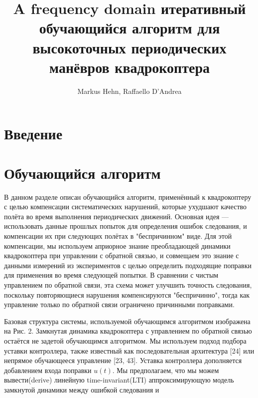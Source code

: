 \documentclass[12pt,a4paper,fleqn]{article}
\title{A frequency domain итеративный обучающийся алгоритм для высокоточных периодических манёвров квадрокоптера}
\author{
  Markus Hehn, Raffaello D’Andrea
}
\begin{document}
\pagestyle{fancy}             %

\maketitle
\tableofcontents
\newpage

\section{Введение} \label{sec:intro}

\section{Обучающийся алгоритм} \label{sec:learn}

В данном разделе описан обучающийся алгоритм, применённый к квадрокоптеру с целью компенсации систематических нарушений, которые ухудшают качество полёта во время выполнения периодических движений. Основная идея --- использовать данные прошлых попыток для определения ошибок следования, и компенсации их при следующих полётах в "беспричинном" виде. Для этой компенсации, мы используем априорное знание преобладающей динамики квадрокоптера при управлении с обратной связью, и совмещаем это знание с данными измерений из экспериментов с целью определить подходящие поправки для применения во время следующей попытки. В сравнении с чистым управлением по обратной связи, эта схема может улучшить точность следования, поскольку повторяющиеся нарушения компенсируются "беспричинно", тогда как управление только по обратной связи ограничено причинными поправками.

Базовая структура системы, используемой обучающимся алгоритмом изображена на Рис. 2. Замкнутая динамика квадрокоптера с управлением по обратной связью остаётся не задетой обучающимся алгоритмом. Мы используем подход подбора уставки контроллера, также известный как последовательная архитектура [24] или непрямое обучающееся управление [23, 43]. Уставка контроллера дополняется добавлением входа поправки $u(t)$. Мы предполагаем, что мы можем вывести(derive) линейную time-invariant(LTI) аппроксимирующую модель замкнутой динамики между ошибкой следования и 

\cite{Faessler17ral}


\newpage


\end{document}
